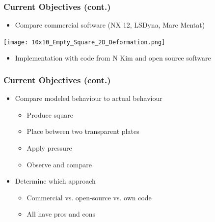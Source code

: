 \documentclass[serif, pdf]{beamer}
\begin{document}

\begin{frame}
    \frametitle{Current Objectives (cont.)}
    \begin{itemize}
        \item<1-> Compare commercial software (NX 12, LSDyna, Marc Mentat)
    \end{itemize}
    \begin{center}
        \texttt{[image: 10x10\_Empty\_Square\_2D\_Deformation.png]}
    \end{center}
    \begin{itemize}
        \item<2-> Implementation with code from N Kim and open source software
    \end{itemize}
\end{frame}


\begin{frame}
    \frametitle{Current Objectives (cont.)}
    \begin{itemize}
        \item<1-> Compare modeled behaviour to actual behaviour
        \changefontsizes{11pt}
        \begin{itemize}
            \item<2-> Produce square
            \item<2-> Place between two transparent plates
            \item<2-> Apply pressure
            \item<2-> Observe and compare
        \end{itemize}
        \item<3-> Determine which approach
        \changefontsizes{11pt}
        \begin{itemize}
            \item<4-> Commercial vs. open-source vs. own code
            \item<5-> All have pros and cons
        \end{itemize}
    \end{itemize}
\end{frame}

\end{document}
